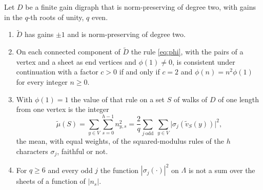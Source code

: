 \begin{corollary}\label{cor:lift}
Let $D$ be a finite gain digraph that is norm-preserving of degree two, with gains in the $q$-th roots of unity, $q$ even.
\begin{enumerate}[label=(\alph*)]
\item $\tilde D$ has gains $\pm1$ and is norm-preserving of degree two.
\item On each connected component of $\tilde D$ the rule \eqref{eq:phi}, with the pairs of a vertex and a sheet as end vertices and $\phi(1)\ne0$, is consistent under continuation with a factor $c>0$ if and only if $c=2$ and $\phi(n)=n^2\phi(1)$ for every integer $n\ge0$.
\item With $\phi(1)=1$ the value of that rule on a set $S$ of walks of $D$ of one length from one vertex is the integer
\begin{equation}\label{eq:lift}
\tilde\mu(S)=\sum_{y\in V}\sum_{s=0}^{h-1}n_{y,s}^2=\frac2q\sum_{j\ \mathrm{odd}}\ \sum_{y\in V}\bigl|\sigma_j(\tilde v_S(y))\bigr|^2 ,
\end{equation}
the mean, with equal weights, of the squared-modulus rules of the $h$ characters $\sigma_j$, faithful or not.
\item For $q\ge6$ and every odd $j$ the function $|\sigma_j(\cdot)|^2$ on $\Lambda$ is not a sum over the sheets of a function of $|n_s|$.
\end{enumerate}
\end{corollary}
